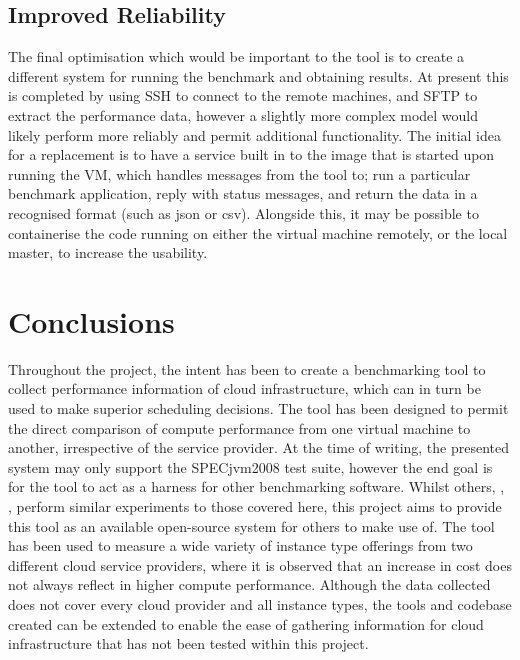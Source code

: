 \documentclass[conference]{IEEEtran}
\begin{document}
\subsection{Improved Reliability}
The final optimisation which would be important to the tool is to create a different system for running the benchmark and obtaining results. At present this is completed by using SSH to connect to the remote machines, and SFTP to extract the performance data, however a slightly more complex model would likely perform more reliably and permit additional functionality. The initial idea for a replacement is to have a service built in to the image that is started upon running the VM, which handles messages from the tool to; run a particular benchmark application, reply with status messages, and return the data in a recognised format (such as json or csv). Alongside this, it may be possible to containerise the code running on either the virtual machine remotely, or the local master, to increase the usability.


\section{Conclusions}

Throughout the project, the intent has been to create a benchmarking tool to collect performance information of cloud infrastructure, which can in turn be used to make superior scheduling decisions. The tool has been designed to permit the direct comparison of compute performance from one virtual machine to another, irrespective of the service provider. At the time of writing, the presented system may only support the SPECjvm2008 test suite, however the end goal is for the tool to act as a harness for other benchmarking software. Whilst others, \cite{li2010cloudcmp}, \cite{chhetri2013smart}, perform similar experiments to those covered here, this project aims to provide this tool as an available open-source system for others to make use of. The tool has been used to measure a wide variety of instance type offerings from two different cloud service providers, where it is observed that an increase in cost does not always reflect in higher compute performance. Although the data collected does not cover every cloud provider and all instance types, the tools and codebase created can be extended to enable the ease of gathering information for cloud infrastructure that has not been tested within this project.



\end{document}
